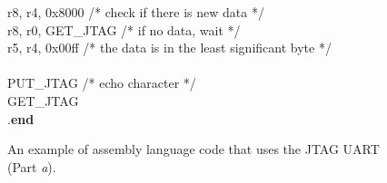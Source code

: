\begin{figure}[h!]
\begin{center}
\begin{minipage}[t]{12.5 cm}
\begin{tabbing}
 \>r8, r4, 0x8000 \>/* check if there is new data */\\
 \>r8, r0, GET\_JTAG \>/* if no data, wait */\\
 \>r5, r4, 0x00ff \>/* the data is in the least significant byte */\\
~\\
 \>PUT\_JTAG \>/* echo character */\\
 \>GET\_JTAG\\
\>.{\bf end}\\
\end{tabbing}
\end{minipage}
\end{center}
	\vspace{-0.33in}\caption{An example of assembly language code that uses the JTAG UART
	(Part {\it a}).}
   \label{fig:jtag_uart_s}
\end{figure}
\pagebreak
\clearpage
\newpage

